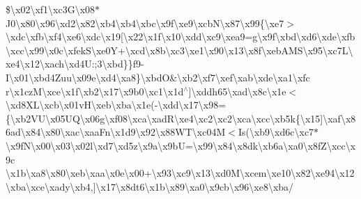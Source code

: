\$\textbackslash{}x02\textbackslash{}xf1\textbackslash{}xc3\+G\textbackslash{}x08$\ast$J0\textbackslash{}x80\textbackslash{}x96\textbackslash{}xd2\textbackslash{}x82\textbackslash{}xb4\textbackslash{}xb4\textbackslash{}xbc\textbackslash{}x9f\textbackslash{}xe9\textbackslash{}xcb\+N\textbackslash{}x87\textbackslash{}x99\{\textbackslash{}xe7$>$\textbackslash{}xdc\textbackslash{}xfb\textbackslash{}xf4\textbackslash{}xe6\textbackslash{}xdc\textbackslash{}x19\mbox{[}\textbackslash{}x22\textbackslash{}x1f\textbackslash{}x10\textbackslash{}xdd\textbackslash{}xc9\textbackslash{}xea9=g\textbackslash{}x9f\textbackslash{}xbd\textbackslash{}xd6\textbackslash{}xde\textbackslash{}xfb\textbackslash{}xcc\textbackslash{}x99\textbackslash{}x0c\textbackslash{}xfek\+S\textbackslash{}xe0Y+\textbackslash{}xcd\textbackslash{}x8b\textbackslash{}xc3\textbackslash{}xe1\textbackslash{}x90\textbackslash{}x13\textbackslash{}x8f\textbackslash{}xeb\+A\+M\+S\textbackslash{}x95\textbackslash{}xc7\+L\textbackslash{}xe4\textbackslash{}x12\textbackslash{}xach\textbackslash{}xd4\+U\+:;3\textbackslash{}xbd\}\}f9-\/I\textbackslash{}x01\textbackslash{}xbd4\+Zuu\textbackslash{}x09e\textbackslash{}xd4\textbackslash{}xa8\}\textbackslash{}xbd\textquotesingle{}O\&\textbackslash{}xb2\textbackslash{}xf7\textbackslash{}xef\textbackslash{}xab\textbackslash{}xde\textbackslash{}xa1\textbackslash{}xfc r\textbackslash{}x1cz\+M\textbackslash{}xce\textbackslash{}x1f\textbackslash{}xb2\textbackslash{}x17\textbackslash{}x9b0\textbackslash{}xc1\textbackslash{}x1d$^\wedge$\mbox{]}\textbackslash{}xddh65\textbackslash{}xad\textbackslash{}x8c\textbackslash{}x1e$<$\textbackslash{}xd8\+X\+L\textbackslash{}xcb\textbackslash{}x01v\+H\textbackslash{}xeb\textbackslash{}xba\textbackslash{}x1e(-\/\textbackslash{}xdd\textbackslash{}x17\textbackslash{}x98=\{\textbackslash{}xb2\+V\+U\textbackslash{}x05\+U\+Q\textbackslash{}x06g\textbackslash{}xf08\textbackslash{}xca\textbackslash{}xad\+R\textbackslash{}xe4\textbackslash{}xc2\textbackslash{}xc2\textbackslash{}xca\textbackslash{}xcc\textbackslash{}xb5k\{\textbackslash{}x15\mbox{]}\textbackslash{}xaf\textbackslash{}x86ad\textbackslash{}x84\textbackslash{}x80\textbackslash{}xac\textbackslash{}xaa\+Fn\textbackslash{}x1d9\textbackslash{}x92\textbackslash{}x88\+W\+T\textbackslash{}xc04M$<$Is(\textbackslash{}xb9\textbackslash{}xd6c\textbackslash{}xc7$\ast$\textbackslash{}x9f\textquotesingle{}N\textbackslash{}x00\textbackslash{}x03\textbackslash{}x02l\textbackslash{}xd7\textbackslash{}xd5z\textbackslash{}x9a\textbackslash{}x9bU=\textbackslash{}x99\textbackslash{}x84\textbackslash{}x8d\textquotesingle{}k\textbackslash{}xb6a\textbackslash{}xa0\textbackslash{}x8f\+Z\textbackslash{}xcc\textbackslash{}x9c \textbackslash{}x1b\textbackslash{}xa8\textbackslash{}x80\textbackslash{}xeb\textbackslash{}xaa\textbackslash{}x0e\textbackslash{}x00+\textbackslash{}x93\textbackslash{}xc9\textbackslash{}x13\textbackslash{}xd0\+M\textbackslash{}xcem\textbackslash{}xe10\textbackslash{}x82\textbackslash{}xe94\textbackslash{}x12\textbackslash{}xba\textbackslash{}xce\textbackslash{}xady\textbackslash{}xb4,\mbox{]}\textbackslash{}x17\textbackslash{}x8dt6\textbackslash{}x1b\textbackslash{}x89\textbackslash{}xa0\textbackslash{}x9cb\textbackslash{}x96\textbackslash{}xe8\textbackslash{}xba/ 
